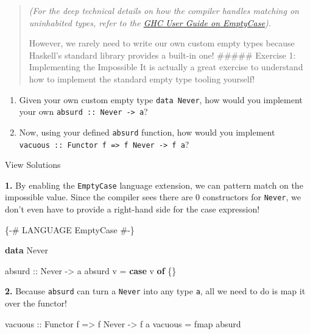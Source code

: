 \documentclass[
]{article}
\newenvironment{Shaded}{}{}
\newcommand{\DataTypeTok}[1]{\textcolor[rgb]{0.56,0.13,0.00}{#1}}
\newcommand{\FunctionTok}[1]{\textcolor[rgb]{0.02,0.16,0.49}{#1}}
\newcommand{\KeywordTok}[1]{\textcolor[rgb]{0.00,0.44,0.13}{\textbf{#1}}}
\newcommand{\NormalTok}[1]{#1}
\newcommand{\OtherTok}[1]{\textcolor[rgb]{0.00,0.44,0.13}{#1}}
\providecommand{\tightlist}{%
  \setlength{\itemsep}{0pt}\setlength{\parskip}{0pt}}
\begin{document}
\begin{quote}
\emph{(For the deep technical details on how the compiler handles
matching on uninhabited types, refer to the
\href{https://ghc.gitlab.haskell.org/ghc/doc/users_guide/exts/empty_case.html}{GHC
User Guide on EmptyCase}).}

However, we rarely need to write our own custom empty types because
Haskell's standard library provides a built-in one! \#\#\#\#\# Exercise
1: Implementing the Impossible It is actually a great exercise to
understand how to implement the standard empty type tooling yourself!
\end{quote}

\begin{enumerate}
\def\labelenumi{\arabic{enumi}.}
\tightlist
\item
  Given your own custom empty type \texttt{data\ Never}, how would you
  implement your own \texttt{absurd\ ::\ Never\ -\textgreater{}\ a}?
\item
  Now, using your defined \texttt{absurd} function, how would you
  implement
  \texttt{vacuous\ ::\ Functor\ f\ =\textgreater{}\ f\ Never\ -\textgreater{}\ f\ a}?
\end{enumerate}

View Solutions

\textbf{1.} By enabling the \texttt{EmptyCase} language extension, we
can pattern match on the impossible value. Since the compiler sees there
are 0 constructors for \texttt{Never}, we don't even have to provide a
right-hand side for the case expression!

\begin{Shaded}
\begin{Highlighting}[]
\OtherTok{\{{-}\# LANGUAGE EmptyCase \#{-}\}}

\KeywordTok{data} \DataTypeTok{Never}

\OtherTok{absurd ::} \DataTypeTok{Never} \OtherTok{{-}\textgreater{}}\NormalTok{ a}
\NormalTok{absurd v }\OtherTok{=} \KeywordTok{case}\NormalTok{ v }\KeywordTok{of}\NormalTok{ \{\}}
\end{Highlighting}
\end{Shaded}

\textbf{2.} Because \texttt{absurd} can turn a \texttt{Never} into any
type \texttt{a}, all we need to do is map it over the functor!

\begin{Shaded}
\begin{Highlighting}[]
\OtherTok{vacuous ::} \DataTypeTok{Functor}\NormalTok{ f }\OtherTok{=\textgreater{}}\NormalTok{ f }\DataTypeTok{Never} \OtherTok{{-}\textgreater{}}\NormalTok{ f a}
\NormalTok{vacuous }\OtherTok{=} \FunctionTok{fmap}\NormalTok{ absurd}
\end{Highlighting}
\end{Shaded}
\end{document}
